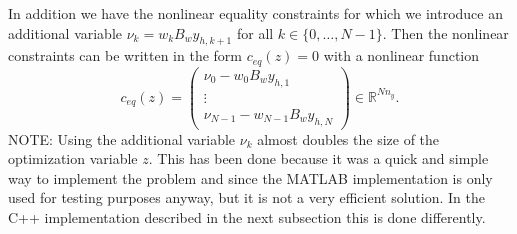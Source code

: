\documentclass[
12pt, %
a4paper, %
onecolumn, %
portrait %
]{article}
\begin{document}
In addition we have the nonlinear equality constraints for which we introduce an additional variable $\nu_k = w_k B_w y_{h,k+1}$ for all $k \in \{0, \hdots, N-1\}$. Then the nonlinear constraints can be written in the form $c_{eq}(z) = 0$ with a nonlinear function
\begin{equation}
c_{eq}(z) =
\begin{pmatrix}
\nu_0 - w_0 B_w y_{h,1} \\
\vdots \\
\nu_{N-1} - w_{N-1} B_w y_{h,N}
\end{pmatrix} \in \mathbb{R}^{N n_y}.
\label{eq:matlab-nonlinear-system-constraints}
\end{equation}
NOTE: Using the additional variable $\nu_k$ almost doubles the size of the optimization variable $z$. This has been done because it was a quick and simple way to implement the problem and since the MATLAB implementation is only used for testing purposes anyway, but it is not a very efficient solution. In the C++ implementation described in the next subsection this is done differently.
\end{document}

